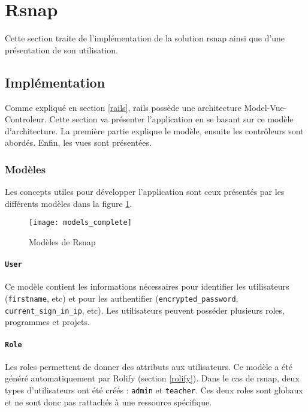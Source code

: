 \section{Rsnap}
\graphicspath{{content/7-solution/3-rsnap/images/}}
Cette section traite de l'implémentation de la solution \gls{rsnap} ainsi que d'une présentation de son utilisation.

\subsection{Implémentation}
Comme expliqué en section \ref{rails}, \gls{rails} possède une architecture Model-Vue-Controleur. Cette section va présenter l'application en se basant sur ce modèle d'architecture. La première partie explique le modèle, ensuite les contrôleurs sont abordés. Enfin, les vues sont présentées.

\subsubsection{Modèles}
Les concepts utiles pour développer l'application sont ceux présentés par les différents modèles dans la figure \ref{fig:models}.

\begin{figure}
 \begin{center}
   \texttt{[image: models\_complete]}
   \caption{Modèles de Rsnap}
   \label{fig:models}
 \end{center}
\end{figure}

\paragraph{\texttt{User}} Ce modèle contient les informations nécessaires pour identifier les utilisateurs (\texttt{firstname}, etc) et pour les authentifier (\texttt{encrypted\_password}, \texttt{current\_sign\_in\_ip}, etc). Les utilisateurs peuvent posséder plusieurs \glspl{role}, programmes et projets.

\paragraph{\texttt{Role}} Les \glspl{role} permettent de donner des attributs aux utilisateurs. Ce modèle a été généré automatiquement par Rolify (section \ref{rolify}). Dans le cas de \gls{rsnap}, deux types d'utilisateurs ont été créés : \texttt{admin} et \texttt{teacher}. Ces deux \glspl{role} sont globaux et ne sont donc pas rattachés à une ressource spécifique.

